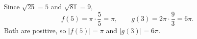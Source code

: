 Since $\sqrt{25}=5$ and $\sqrt{81}=9$,
\[
f(5)=\pi\cdot\dfrac{5}{5}=\pi,\qquad g(3)=2\pi\cdot\dfrac{9}{3}=6\pi .
\]
Both are positive, so $|f(5)|=\boxed{\pi}$ and $|g(3)|=\boxed{6\pi}$.
